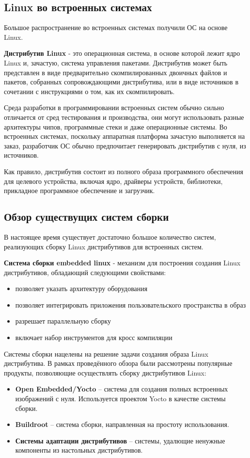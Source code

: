 \newpage
\subsection{Linux во встроенных системах}

Большое распространение во встроенных системах получили ОС на основе Linux.

\textbf{Дистрибутив Linux} - это операционная система, в основе которой лежит ядро Linux и, зачастую, система управления пакетами. 
Дистрибутив может быть представлен в виде предварительно скомпилированных двоичных файлов и пакетов, собранных сопровождающими дистрибутива, или в виде источников в сочетании с инструкциями о том, как их скомпилировать.

Среда разработки в программировании встроенных систем обычно сильно отличается от сред тестирования и производства, они могут использовать разные архитектуры чипов, программные стеки и даже операционные системы.
Во встроенных системах, поскольку аппаратная платформа зачастую выполняется на заказ, разработчик ОС обычно предпочитает генерировать дистрибутив с нуля, из источников.

Как правило, дистрибутив состоит из полного образа программного обеспечения для целевого устройства, включая ядро, драйверы устройств, библиотеки, прикладное программное обеспечение и загрузчик.


\newpage
\subsection{Обзор существущих систем сборки}
В настоящее время существует достаточно большое количество систем, реализующих сборку Linux дистрибутивов для встроенных систем.

\textbf{Система сборки embedded linux} - механизм для построения создания Linux дистрибутивов, обладающий следующими свойствами:
\begin{itemize}
  \item позволяет указать архитектуру оборудования
  \item позволяет интегрировать приложения пользовательского пространства в образ
  \item разрешает параллельную сборку
  \item включает набор инструментов для кросс компиляции
\end{itemize}

Системы сборки нацелены на решение задачи создания образа Linux дистрибутива. 
В рамках проведённого обзора были рассмотрены популярные продукты, позволяющие осуществлять сборку дистрибутивов Linux:
\begin{itemize}
  \item \textbf{Open Embedded/Yocto} -- система для создания полных встроенных изображений с нуля. Используется проектом Yocto в качестве системы сборки.
  \item \textbf{Buildroot} -- система сборки, направленная на простоту использования.
  \item \textbf{Системы адаптации дистрибутивов} -- системы, удалющие ненужные компоненты из настольных дистрибутивов.
\end{itemize}
\newpage
